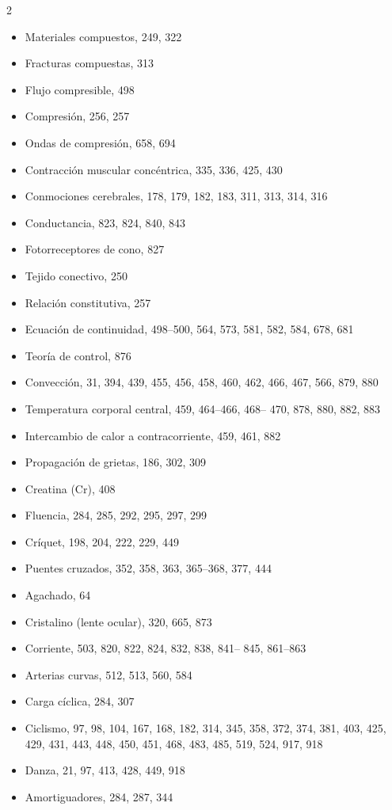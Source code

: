 \documentclass[12pt,a4paper]{book}
\begin{document}
\begin{multicols}{2}
\begin{itemize}[leftmargin=*]
  \item Materiales compuestos, 249, 322
  \item Fracturas compuestas, 313
  \item Flujo compresible, 498
  \item Compresión, 256, 257
  \item Ondas de compresión, 658, 694
  \item Contracción muscular concéntrica, 335, 336, 425, 430
  \item Conmociones cerebrales, 178, 179, 182, 183, 311, 313, 314, 316
  \item Conductancia, 823, 824, 840, 843
  \item Fotorreceptores de cono, 827
  \item Tejido conectivo, 250
  \item Relación constitutiva, 257
  \item Ecuación de continuidad, 498--500, 564, 573, 581, 582, 584, 678, 681
  \item Teoría de control, 876
  \item Convección, 31, 394, 439, 455, 456, 458, 460, 462, 466, 467, 566, 879, 880
  \item Temperatura corporal central, 459, 464--466, 468-- 470, 878, 880, 882, 883
  \item Intercambio de calor a contracorriente, 459, 461, 882
  \item Propagación de grietas, 186, 302, 309
  \item Creatina (Cr), 408
  \item Fluencia, 284, 285, 292, 295, 297, 299
  \item Críquet, 198, 204, 222, 229, 449
  \item Puentes cruzados, 352, 358, 363, 365--368, 377, 444
  \item Agachado, 64
  \item Cristalino (lente ocular), 320, 665, 873
  \item Corriente, 503, 820, 822, 824, 832, 838, 841-- 845, 861--863
  \item Arterias curvas, 512, 513, 560, 584
  \item Carga cíclica, 284, 307
  \item Ciclismo, 97, 98, 104, 167, 168, 182, 314, 345, 358, 372, 374, 381, 403, 425, 429, 431, 443, 448, 450, 451, 468, 483, 485, 519, 524, 917, 918
  \item Danza, 21, 97, 413, 428, 449, 918
  \item Amortiguadores, 284, 287, 344

\end{itemize}
\end{multicols}
\end{document}
